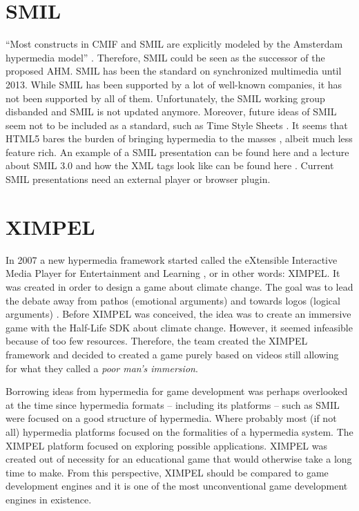 \section{SMIL}
``Most constructs in CMIF and SMIL are explicitly modeled by the Amsterdam hypermedia model'' \cite{ossenbruggen2001}. Therefore, SMIL could be seen as the successor of the proposed AHM. SMIL has been the standard on synchronized multimedia until 2013. While SMIL has been supported by a lot of well-known companies, it has not been supported by all of them. Unfortunately, the SMIL working group disbanded and SMIL is not updated anymore\cite{smilStatus, smilStatus2}. Moreover, future ideas of SMIL seem not to be included as a standard, such as Time Style Sheets \cite{timestylesheets2014}. It seems that HTML5 bares the burden of bringing hypermedia to the masses \cite{smilStatus2}, albeit much less feature rich. An example of a SMIL presentation can be found here \cite{SMIL_example} and a lecture about SMIL 3.0 and how the XML tags look like can be found here \cite{SMIL_lecture}. Current SMIL presentations need an external player or browser plugin.

\section{XIMPEL}
In 2007 a new hypermedia framework started called the eXtensible Interactive Media Player for Entertainment and Learning \cite{eliens2016, eliens2008}, or in other words: XIMPEL. It was created in order to design a game about climate change. The goal was to lead the debate away from pathos (emotional arguments) and towards logos (logical arguments) \cite{eliens2007, eliens2008}. Before XIMPEL was conceived, the idea was to create an immersive game with the Half-Life SDK about climate change. However, it seemed infeasible because of too few resources. Therefore, the team created the XIMPEL framework and decided to created a game purely based on videos still allowing for what they called a \textit{poor man's immersion}. 

Borrowing ideas from hypermedia for game development was perhaps overlooked at the time since hypermedia formats -- including its platforms -- such as SMIL were focused on a good structure of hypermedia. Where probably most (if not all) hypermedia platforms focused on the formalities of a hypermedia system. The XIMPEL platform focused on exploring possible applications. XIMPEL was created out of necessity for an educational game that would otherwise take a long time to make. From this perspective, XIMPEL should be compared to game development engines and it is one of the most unconventional game development engines in existence.

